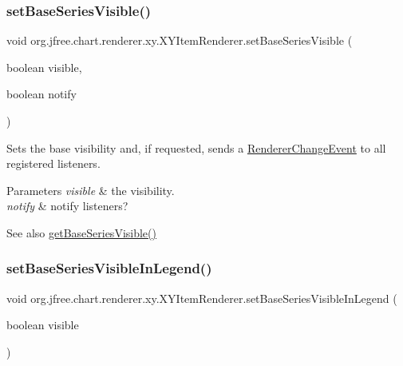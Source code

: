 \subsubsection{\texorpdfstring{set\+Base\+Series\+Visible()}{setBaseSeriesVisible()}\hspace{0.1cm}{\footnotesize\ttfamily [2/2]}}
{\footnotesize\ttfamily void org.\+jfree.\+chart.\+renderer.\+xy.\+X\+Y\+Item\+Renderer.\+set\+Base\+Series\+Visible (\begin{DoxyParamCaption}\item[{boolean}]{visible,  }\item[{boolean}]{notify }\end{DoxyParamCaption})}

Sets the base visibility and, if requested, sends a \mbox{\hyperlink{}{Renderer\+Change\+Event}} to all registered listeners.


\begin{DoxyParams}{Parameters}
{\em visible} & the visibility. \\
\hline
{\em notify} & notify listeners?\\
\hline
\end{DoxyParams}
\begin{DoxySeeAlso}{See also}
\mbox{\hyperlink{interfaceorg_1_1jfree_1_1chart_1_1renderer_1_1xy_1_1_x_y_item_renderer_a7703af7b787a8cc46ec822c840e2f79c}{get\+Base\+Series\+Visible()}} 
\end{DoxySeeAlso}
\mbox{\label{interfaceorg_1_1jfree_1_1chart_1_1renderer_1_1xy_1_1_x_y_item_renderer_ada7d9dbe2c39453f0f453cb569f63dde}} 
\subsubsection{\texorpdfstring{set\+Base\+Series\+Visible\+In\+Legend()}{setBaseSeriesVisibleInLegend()}\hspace{0.1cm}{\footnotesize\ttfamily [1/2]}}
{\footnotesize\ttfamily void org.\+jfree.\+chart.\+renderer.\+xy.\+X\+Y\+Item\+Renderer.\+set\+Base\+Series\+Visible\+In\+Legend (\begin{DoxyParamCaption}\item[{boolean}]{visible }\end{DoxyParamCaption})}

